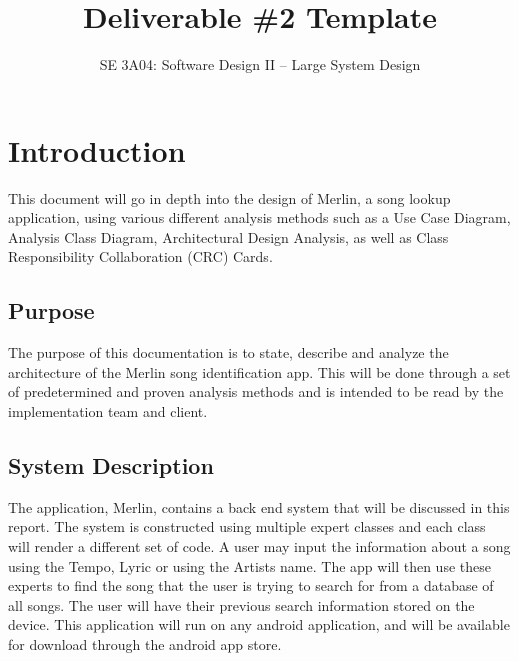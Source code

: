 \documentclass[]{article}
\title{Deliverable \#2 Template}
\author{SE 3A04: Software Design II -- Large System Design}
\date{}
\begin{document}
\maketitle	

\section{Introduction}
\label{sec:introduction}

This document will go in depth into the design of Merlin, a song lookup application, using various different analysis methods such as a Use Case Diagram, Analysis Class Diagram, Architectural Design Analysis, as well as Class Responsibility Collaboration (CRC) Cards.

\subsection{Purpose}
\label{sub:purpose}
	The purpose of this documentation is to state, describe and analyze the architecture of the Merlin song identification app. This will be done through a set of predetermined and proven analysis methods and is intended to be read by the implementation team and client. 

\subsection{System Description}
\label{sub:system_description}
	The application, Merlin, contains a back end system that will be discussed in this report. The system is constructed using multiple expert classes and each class will render a different set of code. A user may input the information about a song using the Tempo, Lyric or using the Artists name. The app will then use these experts to find the song that the user is trying to search for from a database of all songs. The user will have their previous search information stored on the device. This application will run on any android application, and will be available for download through the android app store.
\end{document}
